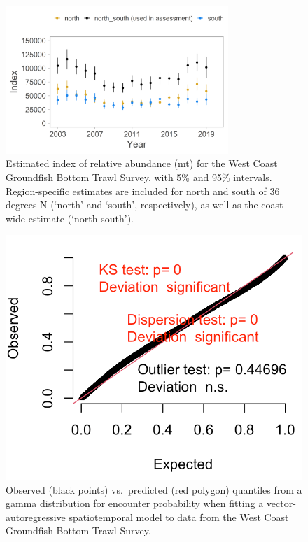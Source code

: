 \documentclass[11pt,
  english,
  a4paper,
]{article}
\begin{document}
\tagmcend\tagstructend


\begin{figure}
\centering
\includegraphics[width=0.75\textwidth,height=0.75\textheight]{figs/Index-Biomass.png}
\caption{Estimated index of relative abundance (mt) for the West Coast Groundfish Bottom Trawl Survey, with 5\% and 95\% intervals. Region-specific estimates are included for north and south of 36 degrees N (`north' and `south', respectively), as well as the coast-wide estimate (`north-south').\label{fig:WCGBTindexest}}
\end{figure}

\tagmcend\tagstructend


\begin{figure}
\centering
\includegraphics[width=1\textwidth,height=1\textheight]{figs/quantile_residuals.png}
\caption{Observed (black points) vs.~predicted (red polygon) quantiles from a gamma distribution for encounter probability when fitting a vector-autoregressive spatiotemporal model to data from the West Coast Groundfish Bottom Trawl Survey. \label{fig:WCGBTQQ}}
\end{figure}
\end{document}

